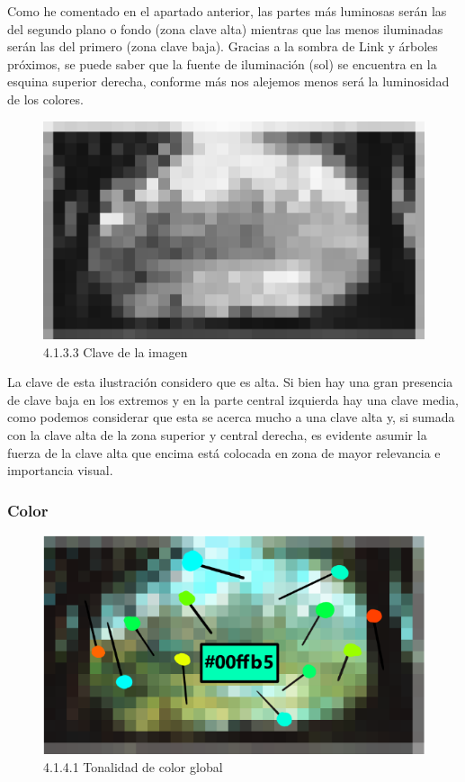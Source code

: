 \documentclass[12pt]{article}
\begin{document}
    Como he comentado en el apartado anterior, las partes más luminosas serán las del segundo plano o fondo (zona clave alta) mientras que las menos iluminadas serán las del primero (zona clave baja). Gracias a la sombra de Link y árboles próximos, se puede saber que la fuente de iluminación (sol) se encuentra en la esquina superior derecha, conforme más nos alejemos menos será la luminosidad de los colores.

    \begin{figure}[H]
      \centering
      \includegraphics[width=\textwidth]{images/Nerea/Nerea Zelda concept 133.PNG}
      \caption{\small 4.1.3.3 Clave de la imagen}
    \end{figure}

    La clave de esta ilustración considero que es alta. Si bien hay una gran presencia de clave baja en los extremos y en la parte central izquierda hay una clave media, como podemos considerar que esta se acerca mucho a una clave alta y, si sumada con la clave alta de la zona superior y central derecha, es evidente asumir la fuerza de la clave alta que encima está colocada en zona de mayor relevancia e importancia visual.


        \subsubsection{Color}


    \begin{figure}[H]
      \centering
      \includegraphics[width=\textwidth]{images/Nerea/Nerea Zelda concept 141.PNG}
      \caption{\small 4.1.4.1 Tonalidad de color global}
    \end{figure}
\end{document}
